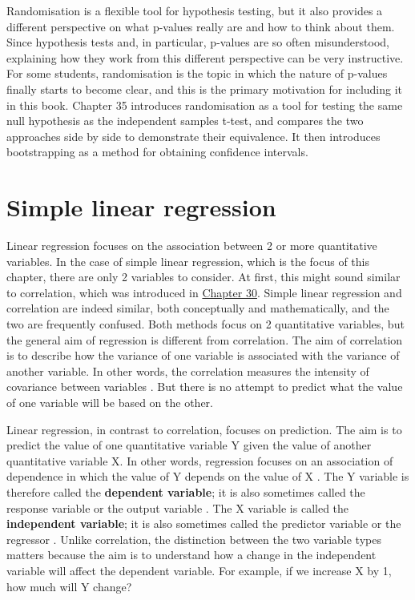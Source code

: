 \documentclass[
  openany]{scrbook}
\begin{document}
\begin{itemize}
  Randomisation is a flexible tool for hypothesis testing, but it also provides a different perspective on what p-values really are and how to think about them.
  Since hypothesis tests and, in particular, p-values are so often misunderstood, explaining how they work from this different perspective can be very instructive.
  For some students, randomisation is the topic in which the nature of p-values finally starts to become clear, and this is the primary motivation for including it in this book.
  Chapter 35 introduces randomisation as a tool for testing the same null hypothesis as the independent samples t-test, and compares the two approaches side by side to demonstrate their equivalence.
  It then introduces bootstrapping as a method for obtaining confidence intervals.
\end{itemize}

\hypertarget{Chapter_32}{%
\chapter{Simple linear regression}\label{Chapter_32}}

Linear regression focuses on the association between 2 or more quantitative variables.
In the case of simple linear regression, which is the focus of this chapter, there are only 2 variables to consider.
At first, this might sound similar to correlation, which was introduced in \protect\hyperlink{Chapter_30}{Chapter 30}.
Simple linear regression and correlation are indeed similar, both conceptually and mathematically, and the two are frequently confused.
Both methods focus on 2 quantitative variables, but the general aim of regression is different from correlation.
The aim of correlation is to describe how the variance of one variable is associated with the variance of another variable.
In other words, the correlation measures the intensity of covariance between variables \citep{Sokal1995}.
But there is no attempt to predict what the value of one variable will be based on the other.

Linear regression, in contrast to correlation, focuses on prediction.
The aim is to predict the value of one quantitative variable Y given the value of another quantitative variable X.
In other words, regression focuses on an association of dependence in which the value of Y depends on the value of X \citep{Rahman1968}.
The Y variable is therefore called the \textbf{dependent variable}; it is also sometimes called the response variable or the output variable \citep{Box1978, Sokal1995}.
The X variable is called the \textbf{independent variable}; it is also sometimes called the predictor variable or the regressor \citep{Box1978, Sokal1995}.
Unlike correlation, the distinction between the two variable types matters because the aim is to understand how a change in the independent variable will affect the dependent variable.
For example, if we increase X by 1, how much will Y change?
\end{document}
